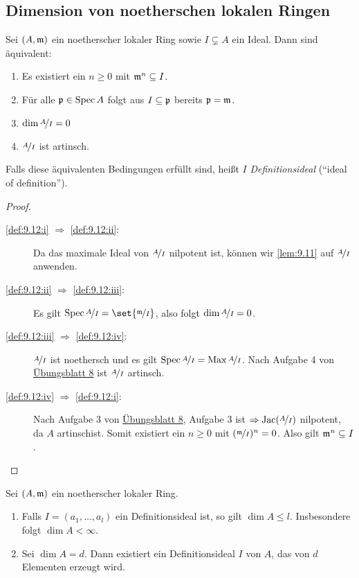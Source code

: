 \documentclass[12pt,a4paper]{scrartcl}
\theoremstyle{cplain}
\theoremstyle{cdef}
\begin{document}
\subsection{Dimension von noetherschen lokalen Ringen}
\begin{defi}
	Sei $(A, \mathfrak{m})$ ein noetherscher lokaler Ring sowie $I\subsetneq A$ ein Ideal. Dann sind äquivalent:
	\begin{enumerate}
		\item Es existiert ein $n\ge 0$ mit $\mathfrak{m}^n\subseteq I$. \label{def:9.12:i}
		\item Für alle $\mathfrak{p} \in \operatorname{Spec} A$ folgt aus $I\subseteq \mathfrak{p}$ bereits $\mathfrak{p} = \mathfrak{m}$. \label{def:9.12:ii}
		\item $\dim \nicefrac{A}{I} = 0$ \label{def:9.12:iii}
		\item $\nicefrac{A}{I}$ ist artinsch. \label{def:9.12:iv}
	\end{enumerate}
	Falls diese äquivalenten Bedingungen erfüllt sind, heißt $I$ \emph{Definitionsideal} (\enquote{ideal of definition}).
\end{defi}
\begin{proof}
	\leavevmode
	\begin{description}
		\item[\ref{def:9.12:i} $\Rightarrow$ \ref{def:9.12:ii}:] Da das maximale Ideal von $\nicefrac{A}{I}$ nilpotent ist, können wir \cref{lem:9.11} auf $\nicefrac{A}{I}$ anwenden.
		\item[\ref{def:9.12:ii} $\Rightarrow$ \ref{def:9.12:iii}:] Es gilt $\Spec \fak AI = \set{\fak \fm I}$, also folgt $\dim \nicefrac{A}{I} = 0$.
		\item[\ref{def:9.12:iii} $\Rightarrow$ \ref{def:9.12:iv}:] $\nicefrac{A}{I}$ ist noethersch und es gilt $\operatorname{Spec} \nicefrac{A}{I} = \operatorname{Max} \nicefrac{A}{I}$. Nach Aufgabe 4 von \href{http://www.math.uni-bonn.de/ag/stroppel/Franzen_Algebra_1_Uebung/Blatt8.pdf}{Übungsblatt 8} ist $\nicefrac{A}{I}$ artinsch.
		\item[\ref{def:9.12:iv} $\Rightarrow$ \ref{def:9.12:i}:] Nach Aufgabe 3 von \href{http://www.math.uni-bonn.de/ag/stroppel/Franzen_Algebra_1_Uebung/Blatt8.pdf}{Übungsblatt 8}, Aufgabe 3 ist $\Rightarrow\operatorname{Jac}(\nicefrac{A}{I})$ nilpotent, da $A$ artinschist. Somit existiert ein $n\ge0$ mit $(\nicefrac{\mathfrak{m}}{I})^n = 0$. Also gilt $\mathfrak{m}^n \subseteq I$.
		\qedhere
	\end{description}
\end{proof}
\begin{satz}
	Sei $(A, \mathfrak{m})$ ein noetherscher lokaler Ring.
	\begin{enumerate}
		\item Falls $I = (a_1,\dots, a_l)$ ein Definitionsideal ist, so gilt $\dim A \le l$. Insbesondere folgt $\dim A <\infty$.
		\item Sei $\dim A = d$. Dann existiert ein Definitionsideal $I$ von $A$, das von $d$ Elementen erzeugt wird.
	\end{enumerate}
\end{satz}
\end{document}
